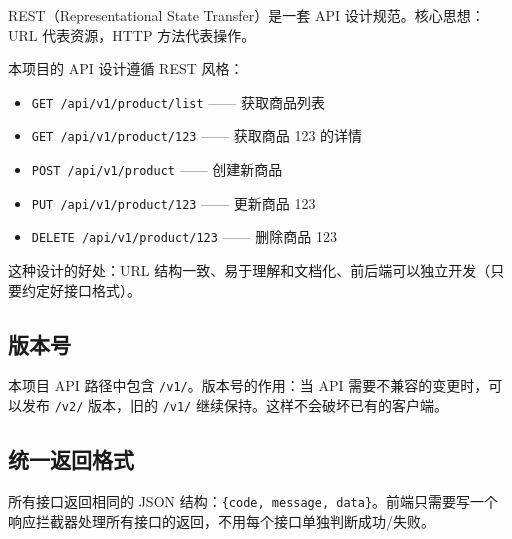 \documentclass[12pt,a4paper]{ctexart}
\begin{document}
REST（Representational State Transfer）是一套 API 设计规范。核心思想：URL 代表资源，HTTP 方法代表操作。

本项目的 API 设计遵循 REST 风格：
\begin{itemize}
  \item \texttt{GET /api/v1/product/list} —— 获取商品列表
  \item \texttt{GET /api/v1/product/123} —— 获取商品 123 的详情
  \item \texttt{POST /api/v1/product} —— 创建新商品
  \item \texttt{PUT /api/v1/product/123} —— 更新商品 123
  \item \texttt{DELETE /api/v1/product/123} —— 删除商品 123
\end{itemize}

这种设计的好处：URL 结构一致、易于理解和文档化、前后端可以独立开发（只要约定好接口格式）。

\subsection{版本号}

本项目 API 路径中包含 \texttt{/v1/}。版本号的作用：当 API 需要不兼容的变更时，可以发布 \texttt{/v2/} 版本，旧的 \texttt{/v1/} 继续保持。这样不会破坏已有的客户端。

\subsection{统一返回格式}

所有接口返回相同的 JSON 结构：\texttt{\{code, message, data\}}。前端只需要写一个响应拦截器处理所有接口的返回，不用每个接口单独判断成功/失败。
\end{document}
